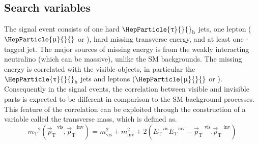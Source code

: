 \documentclass[11.5pt, a4paper]{article}
\newcommand{\mT}{\ensuremath{m_{\mathrm{T}}}\xspace}
\newcommand{\ptvec}{\ensuremath{{\vec p}_{\mathrm{T}}}\xspace}
\newcommand{\ET}{\ensuremath{E_{\mathrm{T}}}\xspace}
\DeclareRobustCommand{\PQb}{{\HepParticle{b}{}{}}\xspace} %
\DeclareRobustCommand{\Pe}{{\HepParticle{e}{}{}}\xspace} %
\DeclareRobustCommand{\PGm}{{\HepParticle{\upmu}{}{}}\xspace} %
\DeclareRobustCommand{\PGt}{{\HepParticle{\uptau}{}{}}\xspace} %
\newcommand{\tauh}{\ensuremath{\PGt_\mathrm{h}}\xspace}
\begin{document}
\subsection{Search variables}
The signal event consists of one hard \tauh jets, one lepton ($\PGm$ or \Pe), hard missing transverse energy, and at least one \PQb-tagged jet. The major sources of missing energy is from the weakly interacting neutralino (which can be massive), unlike the SM backgrounds. The missing energy is correlated with the visible objects, in particular the \tauh jets and leptons ($\PGm$ or \Pe). Consequently in the signal events, the correlation between visible and invisible parts is expected to be different in comparison to the SM background processes. This feature of the correlation can be exploited through the construction of a variable called the transverse mass, which is defined as.
\begin{equation}
\mT^{2}(\ptvec^{~\text{vis}},\ptvec^{~\text{inv}}) = m_{\text{vis}}^{2}+m_{\text{inv}}^{2}+2(\ET^{\text{vis}}\ET^{\text{inv}}-\ptvec^{\text{~vis}}.\ptvec^{\text{~inv}})
\label{eqn:mT}
\end{equation}
\end{document}
